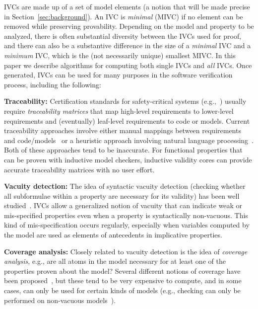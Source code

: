 

IVCs are made up of a set of model elements (a notion that will be made precise in Section~\ref{sec:background}).  An IVC is {\em minimal} (MIVC) if no element can be removed while preserving provability.  Depending on the model and property to be analyzed, there is often substantial diversity between the IVCs used for proof, and there can also be a substantive difference in the size of a {\em minimal} IVC and a {\em minimum} IVC, which is the (not necessarily unique) smallest MIVC.  In this paper we describe algorithms for computing both single IVCs and {\em all} IVCs.  Once generated, IVCs can be used for many purposes in the software verification process, including the following:

\noindent \textbf{Traceability:} Certification standards for safety-critical systems (e.g.,~\cite{DO178C, MOD:00-55}) usually require {\em traceability matrices} that map high-level requirements to lower-level requirements and (eventually) leaf-level requirements to code or models.  Current traceability approaches involve either manual mappings between requirements and code/models~\cite{SimulinkTraceability} or a heuristic approach involving natural language processing~\cite{Keenan12:Tracelab}.  Both of these approaches tend to be inaccurate.  For functional properties that can be proven with inductive model checkers, inductive validity cores can provide accurate traceability matrices with no user effort.

\noindent \textbf{Vacuity detection:} The idea of syntactic vacuity detection (checking whether all subformulae within a property are necessary for its validity) has been well studied~\cite{Kupferman03:Vacuity}.   IVCs allow a generalized notion of vacuity that can indicate weak or mis-specified properties even when a property is syntactically non-vacuous.   This kind of mis-specification occurs regularly, especially when variables computed by the model are used as elements of antecedents in implicative properties.

\noindent \textbf{Coverage analysis:} Closely related to vacuity detection is the idea of {\em coverage analysis}, e.g., are all atoms in the model necessary for at least one of the properties proven about the model?  Several different notions of coverage have been proposed~\cite{chockler_coverage_2003, kupferman_theory_2008}, but these tend to be very expensive to compute, and in some cases, can only be used for certain kinds of models (e.g., checking can only be performed on non-vacuous models~\cite{kupferman_theory_2008}).

